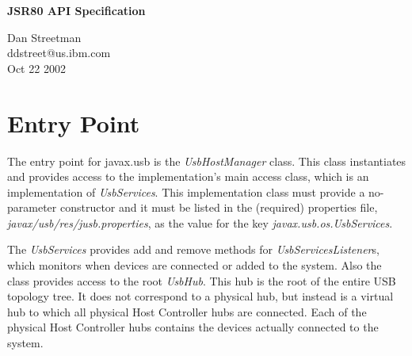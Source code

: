 \documentclass{article}
\newcommand{\mytitle}[0]{JSR80 API Specification}
\newcommand{\myauthor}[0]{Dan Streetman}
\newcommand{\mydate}[0]{Oct 22 2002}
\newcommand{\name}[1]{\emph{#1}}
\begin{document}
\pagestyle{empty}

%

\begin{titlepage}

\begin{center}
\Huge{\textbf{\mytitle}}
\end{center}

\vfill
\vfill

\begin{flushright}
\large{\myauthor}
\\
\large{ddstreet@us.ibm.com}
\\
\large{\mydate}
\end{flushright}

\vfill

\end{titlepage}

\newpage


%

\pagestyle{fancy}
\fancyhf{}
\renewcommand{\sectionmark}[1]{\markright{\emph{\mytitle}}}
\renewcommand{\subsectionmark}[1]{\markright{\emph{\mytitle}}}
\renewcommand{\subsubsectionmark}[1]{\markright{\emph{\mytitle}}}
\fancyhead[LE,RO]{\bfseries\thepage}
\fancyhead[LO]{\rightmark}


%

\tableofcontents

\listoftables

\listoffigures

\newpage

%

\section{Entry Point}

The entry point for javax.usb is the \name{UsbHostManager} class.  This class instantiates
and provides access to the implementation's main access class, which is an implementation of
\name{UsbServices}.  This implementation class must provide a no-parameter constructor
and it must be listed in the (required) properties file, \name{javax/usb/res/jusb.properties},
as the value for the key \name{javax.usb.os.UsbServices}.

The \name{UsbServices} provides add and remove methods for \name{UsbServicesListener}s, which
monitors when devices are connected or added to the system.  Also the class provides access
to the root \name{UsbHub}.  This hub is the root of the entire USB topology tree.  It does
not correspond to a physical hub, but instead is a virtual hub to which all physical Host Controller
hubs are connected.  Each of the physical Host Controller hubs contains the devices actually
connected to the system.
\end{document}
